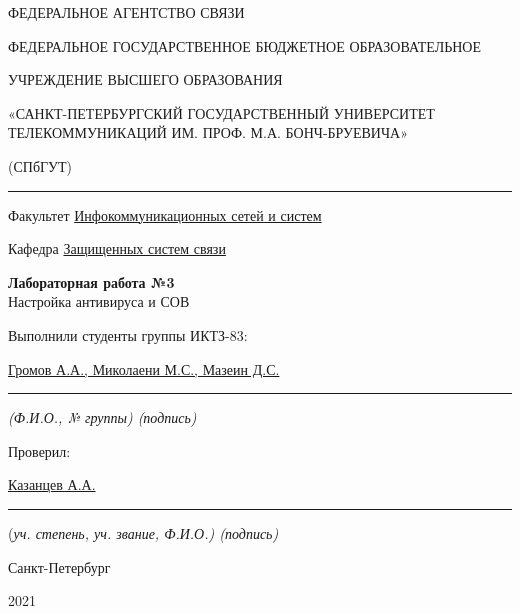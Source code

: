 \documentclass[a4paper,14pt]{extarticle}
\begin{document}
    \begin{center}
        \thispagestyle{empty}
        \begin{singlespace}
        ФЕДЕРАЛЬНОЕ АГЕНТСТВО СВЯЗИ

        ФЕДЕРАЛЬНОЕ ГОСУДАРСТВЕННОЕ БЮДЖЕТНОЕ ОБРАЗОВАТЕЛЬНОЕ

        УЧРЕЖДЕНИЕ ВЫСШЕГО ОБРАЗОВАНИЯ

        «САНКТ-ПЕТЕРБУРГСКИЙ ГОСУДАРСТВЕННЫЙ УНИВЕРСИТЕТ ТЕЛЕКОММУНИКАЦИЙ ИМ. ПРОФ. М.А. БОНЧ-БРУЕВИЧА»

        (СПбГУТ)
        \end{singlespace}
        \vspace{-1ex}
        \rule{\textwidth}{0.4pt}
        \vspace{-5ex}

        Факультет \underline{Инфокоммуникационных сетей и систем}

        Кафедра \underline{Защищенных систем связи}
        \vspace{10ex}

        \textbf{Лабораторная работа №3}\\
        Настройка антивируса и СОВ
        


    \end{center}
    \vspace{4ex}
    \begin{flushright}
    \parbox{10 cm}{
    \begin{flushleft}
        Выполнили студенты группы ИКТЗ-83:

        \underline{Громов А.А., Миколаени М.С., Мазеин Д.С.} \hfill \rule[-0.85ex]{0.1\textwidth}{0.6pt}

        \footnotesize \textit{ (Ф.И.О., № группы) \hfill (подпись)} \normalsize

        Проверил:

        \underline{Казанцев А.А.} \hfill \rule[-0.85ex]{0.1\textwidth}{0.6pt}

        (\footnotesize \textit{уч. степень, уч. звание, Ф.И.О.) \hfill (подпись)} \normalsize

    \end{flushleft}
    }
    \end{flushright}
    \begin{center}
        \vfill
        Санкт-Петербург

        2021

    \end{center}
    \newpage
\end{document}
